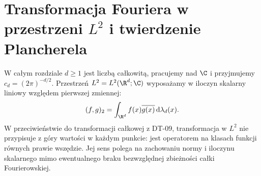 \section{Transformacja Fouriera w przestrzeni $L^2$ i twierdzenie Plancherela}
\providecommand{\atlasref}[2]{#2}

W całym rozdziale $d\ge1$ jest liczbą całkowitą, pracujemy nad $\C$ i przyjmujemy
$c_d=(2\pi)^{-d/2}$. Przestrzeń $L^2=L^2(\R^d;\C)$
wyposażamy w iloczyn skalarny liniowy względem pierwszej
zmiennej:
\[
 (f,g)_2=\int_{\R^d}f(x)\overline{g(x)}\,\mathrm d\lambda_d(x).
\]
W przeciwieństwie do transformacji całkowej z DT-09,
transformacja w $L^2$ nie przypisuje z góry wartości
w każdym punkcie: jest operatorem na klasach funkcji
równych prawie wszędzie. Jej sens polega na zachowaniu
normy i iloczynu skalarnego mimo ewentualnego braku
bezwzględnej zbieżności całki Fourierowskiej.

